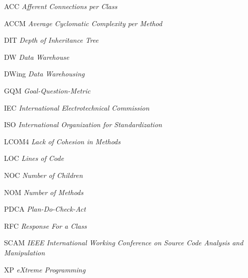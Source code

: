 \begin{siglas}

\item [ACC]   \textit{Afferent Connections per Class}
\item [ACCM]  \textit{Average Cyclomatic Complexity per Method}
\item [DIT]	  \textit{Depth of Inheritance Tree}
\item [DW]	  \textit{Data Warehouse}
\item [DWing] \textit{Data Warehousing}
\item [GQM]   \textit{Goal-Question-Metric}
\item [IEC]   \textit{International Electrotechnical Commission}
\item [ISO]   \textit{International Organization for Standardization}
\item [LCOM4] \textit{Lack of Cohesion in Methods}
\item [LOC]   \textit{Lines of Code}
\item [NOC]   \textit{Number of Children}
\item [NOM]   \textit{Number of Methods}
\item [PDCA]  \textit{Plan-Do-Check-Act}
\item [RFC]   \textit{Response For a Class}
\item [SCAM]  \textit{IEEE International Working Conference on Source Code Analysis and Manipulation}
\item [XP]    \textit{eXtreme Programming}
  
\end{siglas}

